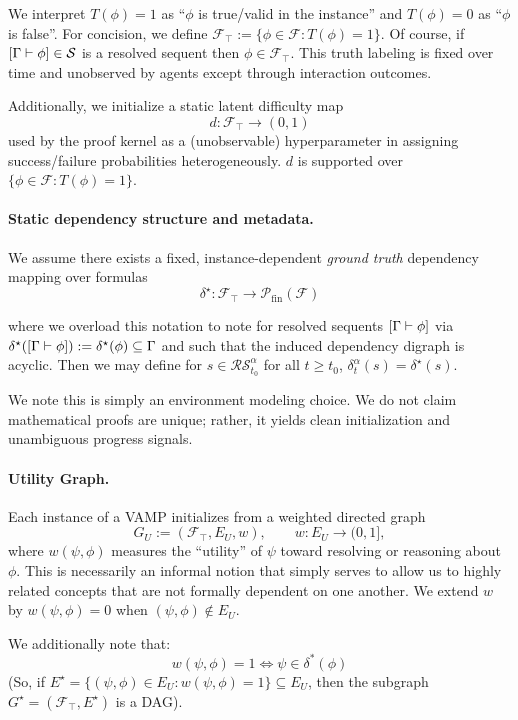 We interpret $T(\phi)=1$ as ``$\phi$ is true/valid in the instance'' and $T(\phi)=0$ as ``$\phi$ is false''. For concision, we define $\mathcal{F}_\top := \{\phi \in \mathcal F : T(\phi)=1\}$. Of course, if $[\Gamma \vdash \phi]\in\mathcal S$ is a resolved sequent then $\phi \in \mathcal{F}_\top$.
This truth labeling is fixed over time and unobserved by agents except through interaction outcomes.

Additionally, we initialize a static latent difficulty map
\[
d:\mathcal F_\top\to (0,1)
\]
used by the proof kernel as a (unobservable) hyperparameter in assigning success/failure probabilities heterogeneously. $d$ is supported over $\{\phi \in \mathcal F : T(\phi)=1\}$.




\paragraph{Static dependency structure and metadata.}
We assume there exists a fixed, instance-dependent \emph{ground truth} dependency mapping over formulas
\[
\delta^\star : \mathcal{F}_\top\to \mathcal{P}_{\mathrm{fin}}(\mathcal{F})
\]

where we overload this notation to note for resolved sequents $[\Gamma \vdash \phi]$ via $\delta^\star([\Gamma \vdash \phi]) := \delta^\star(\phi) \subseteq \Gamma$ and such that the induced dependency digraph is acyclic. Then we may define for $s \in \mathcal{RS}_{t_0}^\alpha$ for all $t \ge t_0$, $\delta^\alpha_t(s) = \delta^\star(s)$.

We note this is simply an environment modeling choice. We do not claim mathematical proofs are unique; rather, it yields clean initialization and unambiguous progress signals.

\paragraph{Utility Graph.}
Each instance of a VAMP initializes from a weighted directed graph
\[
G_U := (\mathcal F_\top, E_U, w),\qquad w:E_U\to(0,1],
\]
where $w(\psi,\phi)$ measures the ``utility'' of $\psi$ toward resolving or reasoning about $\phi$. This is necessarily an informal notion that simply serves to allow us to highly related concepts that are not formally dependent on one another. We extend $w$ by $w(\psi,\phi)=0$ when $(\psi, \phi)\notin E_U$.

We additionally note that:
\[w(\psi, \phi)=1 \iff \psi \in \delta^*(\phi)\]
(So, if $E^\star = \{(\psi,\phi) \in E_U : w(\psi,\phi)=1\} \subseteq E_U$, then the subgraph $G^\star = (\mathcal{F}_\top,E^\star)$ is a DAG).


